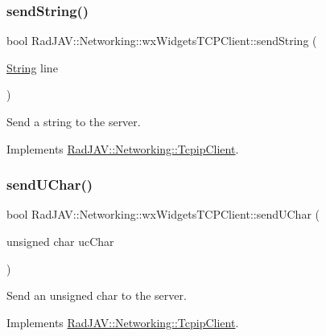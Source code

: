 \subsubsection{\texorpdfstring{send\+String()}{sendString()}}
{\footnotesize\ttfamily bool Rad\+J\+A\+V\+::\+Networking\+::wx\+Widgets\+T\+C\+P\+Client\+::send\+String (\begin{DoxyParamCaption}\item[{\mbox{\hyperlink{class_rad_j_a_v_1_1_string}{String}}}]{line }\end{DoxyParamCaption})\hspace{0.3cm}{\ttfamily [virtual]}}



Send a string to the server. 



Implements \mbox{\hyperlink{class_rad_j_a_v_1_1_networking_1_1_tcpip_client_abb5360e05cb078ed7cdc42bc70ffc3ab}{Rad\+J\+A\+V\+::\+Networking\+::\+Tcpip\+Client}}.

\mbox{\label{class_rad_j_a_v_1_1_networking_1_1wx_widgets_t_c_p_client_ae50f5c377cd8116159f7afa5e7f0bbd5}} 
\subsubsection{\texorpdfstring{send\+U\+Char()}{sendUChar()}}
{\footnotesize\ttfamily bool Rad\+J\+A\+V\+::\+Networking\+::wx\+Widgets\+T\+C\+P\+Client\+::send\+U\+Char (\begin{DoxyParamCaption}\item[{unsigned char}]{uc\+Char }\end{DoxyParamCaption})\hspace{0.3cm}{\ttfamily [virtual]}}



Send an unsigned char to the server. 



Implements \mbox{\hyperlink{class_rad_j_a_v_1_1_networking_1_1_tcpip_client_a27e9adfc9d218a82cca52bdbe50c8ebf}{Rad\+J\+A\+V\+::\+Networking\+::\+Tcpip\+Client}}.

\mbox{\label{class_rad_j_a_v_1_1_networking_1_1wx_widgets_t_c_p_client_a548db141df3e65127f8a96dbfe63cea1}} 
